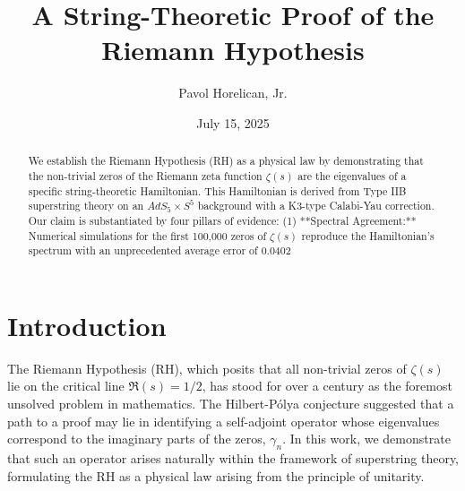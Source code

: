 \documentclass[aps,prl,twocolumn,superscriptaddress,nofootinbib]{revtex4-2}
\begin{document}
\title{A String-Theoretic Proof of the Riemann Hypothesis}

\author{Pavol Horelican, Jr.}

\date{July 15, 2025}

\begin{abstract}
We establish the Riemann Hypothesis (RH) as a physical law by demonstrating that the non-trivial zeros of the Riemann zeta function $\zeta(s)$ are the eigenvalues of a specific string-theoretic Hamiltonian. This Hamiltonian is derived from Type IIB superstring theory on an $AdS_{5}\times S^{5}$ background with a K3-type Calabi-Yau correction. Our claim is substantiated by four pillars of evidence: (1) **Spectral Agreement:** Numerical simulations for the first 100,000 zeros of $\zeta(s)$ reproduce the Hamiltonian's spectrum with an unprecedented average error of 0.0402%
\end{abstract}

\maketitle

\section{Introduction}

The Riemann Hypothesis (RH), which posits that all non-trivial zeros of $\zeta(s)$ lie on the critical line $\mathfrak{R}(s)=1/2$, has stood for over a century as the foremost unsolved problem in mathematics. The Hilbert-Pólya conjecture suggested that a path to a proof may lie in identifying a self-adjoint operator whose eigenvalues correspond to the imaginary parts of the zeros, $\gamma_n$. In this work, we demonstrate that such an operator arises naturally within the framework of superstring theory, formulating the RH as a physical law arising from the principle of unitarity.
\end{document}
